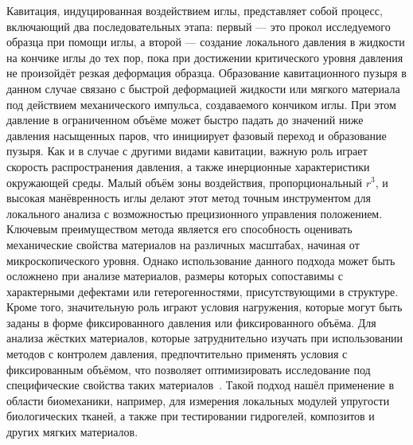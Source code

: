 Кавитация, индуцированная воздействием иглы, представляет собой процесс, включающий два последовательных этапа: первый — это прокол исследуемого образца при помощи иглы, а второй — создание локального давления в жидкости на кончике иглы до тех пор, пока при достижении критического уровня давления не произойдёт резкая деформация образца. 
Образование кавитационного пузыря в данном случае связано с быстрой деформацией жидкости или мягкого материала под действием механического импульса, создаваемого кончиком иглы. 
При этом давление в ограниченном объёме может быстро падать до значений ниже давления насыщенных паров, что инициирует фазовый переход и образование пузыря. 
Как и в случае с другими видами кавитации, важную роль играет скорость распространения давления, а также инерционные характеристики окружающей среды.
Малый объём зоны воздействия, пропорциональный \(r^3\), и высокая манёвренность иглы делают этот метод точным инструментом для локального анализа с возможностью прецизионного управления положением. 
Ключевым преимуществом метода является его способность оценивать механические свойства материалов на различных масштабах, начиная от микроскопического уровня. 
Однако использование данного подхода может быть осложнено при анализе материалов, размеры которых сопоставимы с характерными дефектами или гетерогенностями, присутствующими в структуре. 
Кроме того, значительную роль играют условия нагружения, которые могут быть заданы в форме фиксированного давления или фиксированного объёма. 
Для анализа жёстких материалов, которые затруднительно изучать при использовании методов с контролем давления, предпочтительно применять условия с фиксированным объёмом, что позволяет оптимизировать исследование под специфические свойства таких материалов~\cite{10.1039/c5sm00230c, 10.1039/b909237d}.
Такой подход нашёл применение в области биомеханики, например, для измерения локальных модулей упругости биологических тканей, а также при тестировании гидрогелей, композитов и других мягких материалов.

